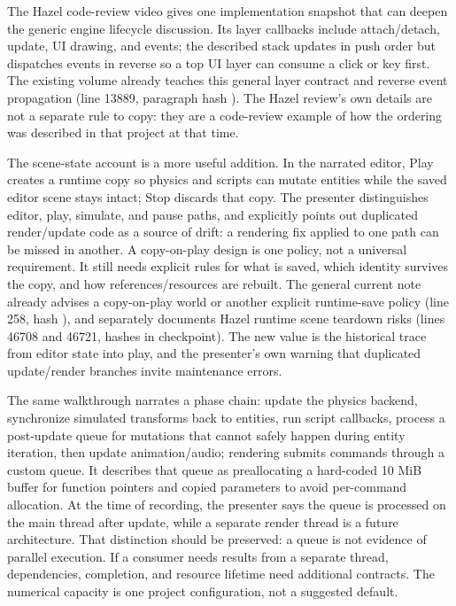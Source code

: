 The Hazel code-review video gives one implementation snapshot that can deepen the generic engine lifecycle discussion. Its layer callbacks include attach/detach, update, UI drawing, and events; the described stack updates in push order but dispatches events in reverse so a top UI layer can consume a click or key first. The existing volume already teaches this general layer contract and reverse event propagation (line 13889, paragraph hash ). The Hazel review's own details are not a separate rule to copy: they are a code-review example of how the ordering was described in that project at that time.

The scene-state account is a more useful addition. In the narrated editor, Play creates a runtime copy so physics and scripts can mutate entities while the saved editor scene stays intact; Stop discards that copy. The presenter distinguishes editor, play, simulate, and pause paths, and explicitly points out duplicated render/update code as a source of drift: a rendering fix applied to one path can be missed in another. A copy-on-play design is one policy, not a universal requirement. It still needs explicit rules for what is saved, which identity survives the copy, and how references/resources are rebuilt. The general current note already advises a copy-on-play world or another explicit runtime-save policy (line 258, hash ), and separately documents Hazel runtime scene teardown risks (lines 46708 and 46721, hashes in checkpoint). The new value is the historical trace from editor state into play, and the presenter's own warning that duplicated update/render branches invite maintenance errors.

The same walkthrough narrates a phase chain: update the physics backend, synchronize simulated transforms back to entities, run script callbacks, process a post-update queue for mutations that cannot safely happen during entity iteration, then update animation/audio; rendering submits commands through a custom queue. It describes that queue as preallocating a hard-coded 10 MiB buffer for function pointers and copied parameters to avoid per-command allocation. At the time of recording, the presenter says the queue is processed on the main thread after update, while a separate render thread is a future architecture. That distinction should be preserved: a queue is not evidence of parallel execution. If a consumer needs results from a separate thread, dependencies, completion, and resource lifetime need additional contracts. The numerical capacity is one project configuration, not a suggested default.

